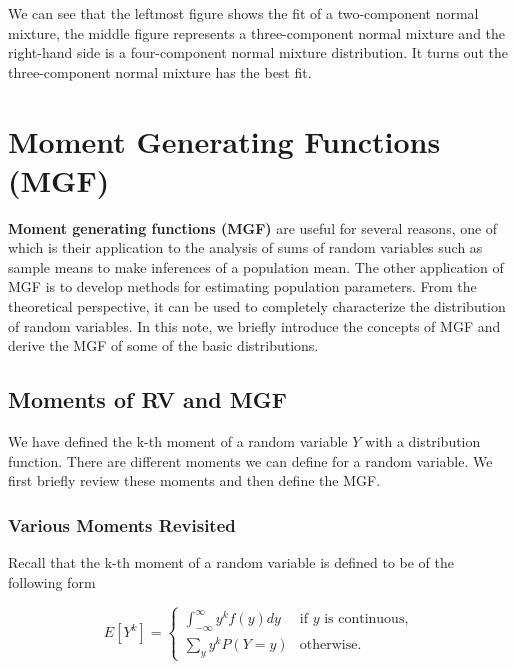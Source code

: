 \documentclass[
]{book}
\begin{document}
We can see that the leftmost figure shows the fit of a two-component normal mixture, the middle figure represents a three-component normal mixture and the right-hand side is a four-component normal mixture distribution. It turns out the three-component normal mixture has the best fit.

\hfill\break

\hfill\break

\hypertarget{moment-generating-functions-mgf}{%
\chapter{Moment Generating Functions (MGF)}\label{moment-generating-functions-mgf}}

\textbf{Moment generating functions (MGF)} are useful for several reasons, one of which is their application to the analysis of sums of random variables such as sample means to make inferences of a population mean. The other application of MGF is to develop methods for estimating population parameters. From the theoretical perspective, it can be used to completely characterize the distribution of random variables. In this note, we briefly introduce the concepts of MGF and derive the MGF of some of the basic distributions.

\hypertarget{moments-of-rv-and-mgf}{%
\section{Moments of RV and MGF}\label{moments-of-rv-and-mgf}}

We have defined the k-th moment of a random variable \(Y\) with a distribution function. There are different moments we can define for a random variable. We first briefly review these moments and then define the MGF.

\hypertarget{various-moments-revisited}{%
\subsection{Various Moments Revisited}\label{various-moments-revisited}}

Recall that the k-th moment of a random variable is defined to be of the following form

\[
\displaystyle E[Y^k] = \begin{cases} 
 \int_{-\infty}^{\infty} y^k f(y)dy & \text{if $y$ is continuous}, \\  
 \sum_y y^kP(Y=y) & \text{otherwise}.
 \end{cases}
\]
\end{document}
